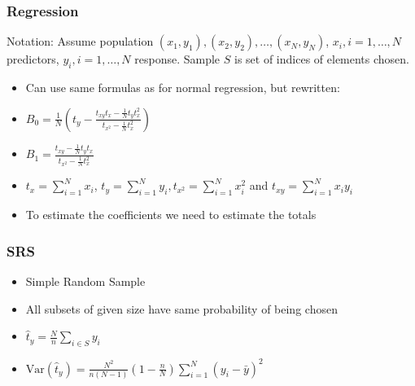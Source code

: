 \documentclass{beamer}
\begin{document}

\begin{frame}
  \frametitle{Regression}

  Notation: Assume population \((x_1, y_1), (x_2, y_2), \dots , (x_N, y_N)\),
  \(x_i, i = 1, \dots, N\) predictors, \(y_i, i = 1, \dots, N\) response. Sample
  \(S\) is set of indices of elements chosen.

  \begin{itemize}
  \addtolength{\itemsep}{0.5\baselineskip}
  \item Can use same formulas as for normal regression, but rewritten:
  \item \(B_0 = \frac{1}{N} \left( t_y - \frac{t_{xy} t_x - \frac{1}{N} t_y t_x^2}
   {t_{x^2} - \frac{1}{N} t_x^2} \right) \)
  \item \(B_1 = \frac{t_{xy} - \frac{1}{N} t_y t_x}
   {t_{x^2} - \frac{1}{N} t_x^2} \)
  \item \(t_x = \sum_{i = 1}^N x_i\), \(t_y = \sum_{i = 1}^N y_i, t_{x^2} =
\sum_{i = 1}^N x_i^2\) and \(t_{xy} =
\sum_{i = 1}^N x_i y_i\)
  \item To estimate the coefficients we need to estimate the totals %
  \end{itemize}
\end{frame}

\begin{frame}
  \frametitle{SRS}

  \begin{itemize}
  \addtolength{\itemsep}{0.5\baselineskip}
  \item Simple Random Sample
  \item All subsets of given size have same probability of being chosen
  \item \(\hat{t}_y = \frac{N}{n}\sum_{i \in S}y_i\) %
  \item \(\mathrm{Var} \left( \hat{t}_y \right) = \frac{N^2}{n \left( N - 1 \right)} \left( 1 - \frac{n}{N} \right) \sum_{i = 1}^N (y_i - \bar{y})^2 \)
  \end{itemize}
\end{frame}
\end{document}
